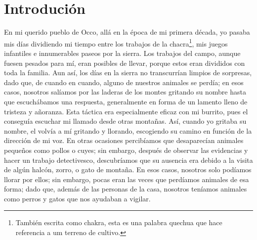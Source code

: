 \cleardoublepage
\newpage
\ifdefined\EnableIncludeImages
\fi
\chapter*{Introdución} %

En mi querido pueblo de Occo, allá en la época de mi primera década, yo pasaba mis días dividiendo mi tiempo entre los trabajos de la chacra\footnote{También escrita como chakra, esta es una palabra quechua que hace referencia a um terreno de cultivo.}, mis juegos infantiles e innumerables paseos por la sierra.
Los trabajos del campo, aunque fuesen pesados para mí, eran posibles de llevar, porque estos eran divididos con toda la familia. 
Aun así, los días en la sierra no transcurrían limpios de sorpresas, dado que, de cuando en cuando, alguno de nuestros animales se perdía; en esos casos, nosotros salíamos por las laderas de los montes gritando su nombre hasta que escuchábamos una respuesta, generalmente en forma de un lamento lleno de tristeza y añoranza.
Esta táctica era especialmente eficaz con mi burrito, pues el conseguía escuchar mi llamado desde otras montañas. Así, cuando yo gritaba su nombre, el volvía a mí gritando y llorando, escogiendo su camino en función de la dirección de mi voz.  
En otras ocasiones percibíamos que desaparecían animales pequeños como pollos o cuyes; sin embargo, después de observar las evidencias y hacer un trabajo detectivesco, descubríamos que su ausencia era debido a la visita de algún halcón, zorro, o gato de montaña.
En esos casos, nosotros solo podíamos llorar por ellos; sin embargo, pocas eran las veces que perdíamos animales de esa forma; dado que, además de las personas de la casa, nosotros teníamos animales como perros y gatos que nos ayudaban a vigilar.

